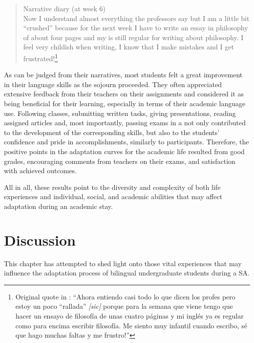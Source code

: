 \documentclass[output=paper]{langsci/langscibook}
\begin{document}
\begin{quote}
Narrative diary (at week 6)
\smallskip\\
Now I understand almost everything the professors say but I am a little bit “crushed” because for the next week I have to write an essay in philosophy of about four pages and my  is still regular for writing about philosophy. I feel very childish when writing, I know that I make mistakes and I get frustrated!\footnote{Original quote in : “Ahora entiendo casi todo lo que dicen los profes pero estoy un poco “rallada” \textit{[sic]} porque para la semana que viene tengo que hacer un ensayo de filosofía de unas cuatro páginas y mi inglés ya es regular como para encima escribir filosofía. Me siento muy infantil cuando escribo, sé que hago muchas faltas y me frustro!”}
\end{quote}

 As can be judged from their narratives, most students felt a great improvement in their language skills as the sojourn proceeded. They often appreciated extensive feedback from their teachers on their assignments and considered it as being beneficial for their learning, especially in terms of their academic language use. Following classes, submitting written tasks, giving presentations, reading assigned articles and, most importantly, passing exams in a  not only contributed to the development of the corresponding skills, but also to the students’  confidence and pride in accomplishments, similarly to   participants. Therefore, the positive  points in the adaptation curves for the academic life resulted from good grades, encouraging comments from teachers on their exams, and satisfaction with achieved outcomes.

All in all, these results point to the diversity and complexity of both life experiences and individual, social,  and academic abilities that may affect adaptation during an academic stay.   


\section{Discussion}
\largerpage
This chapter has attempted to shed light onto those vital experiences that may influence the adaptation process of bilingual undergraduate students during a SA.
\end{document}
